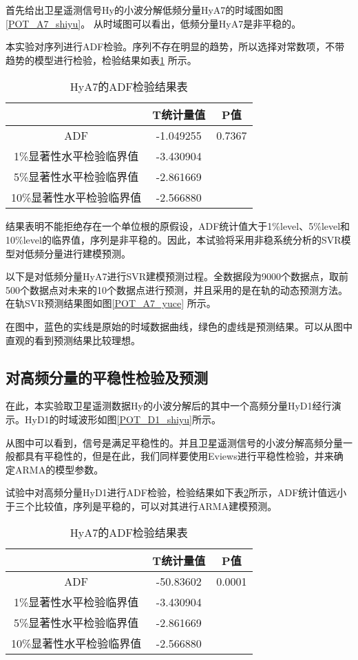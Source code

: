 首先给出卫星遥测信号Hy的小波分解低频分量HyA7的时域图如图\ref{POT_A7_shiyu}。
从时域图可以看出，低频分量HyA7是非平稳的。

本实验对序列进行ADF检验。序列不存在明显的趋势，所以选择对常数项，不带趋势的模型进行检验，检验结果如表\ref{tab:HyA7_ADF} 所示。
\begin{table}[htbp] 
	\centering
	\caption{\label{tab:HyA7_ADF}HyA7的ADF检验结果表} 
	\begin{tabular}{ccc} 
		\toprule 
		{} & T统计量值 & P值\\ 
		\midrule
		ADF & -1.049255 &  0.7367 \\
		1\%显著性水平检验临界值 & -3.430904 & {}\\ 
		5\%显著性水平检验临界值& -2.861669 & {}\\
		10\%显著性水平检验临界值& -2.566880 & {}\\
		\bottomrule 
	\end{tabular} 
\end{table}
结果表明不能拒绝存在一个单位根的原假设，ADF统计值大于1\%level、5\%level和10\%level的临界值，序列是非平稳的。因此，本试验将采用非稳系统分析的SVR模型对低频分量进行建模预测。

以下是对低频分量HyA7进行SVR建模预测过程。全数据段为9000个数据点，取前500个数据点对未来的10个数据点进行预测，并且采用的是在轨的动态预测方法。在轨SVR预测结果图如图\ref{POT_A7_yuce} 所示。

在图中，蓝色的实线是原始的时域数据曲线，绿色的虚线是预测结果。可以从图中直观的看到预测结果比较理想。

\subsection{对高频分量的平稳性检验及预测}
在此，本实验取卫星遥测数据Hy的小波分解后的其中一个高频分量HyD1经行演示。HyD1的时域波形如图\ref{POT_D1_shiyu}所示。

从图中可以看到，信号是满足平稳性的。并且卫星遥测信号的小波分解高频分量一般都具有平稳性的，但是在此，我们同样要使用Eviews进行平稳性检验，并来确定ARMA的模型参数。

试验中对高频分量HyD1进行ADF检验，检验结果如下表\ref{tab:HyD1_ADF}所示，ADF统计值远小于三个比较值，序列是平稳的，可以对其进行ARMA建模预测。
\begin{table}[htbp] 
	\centering
	\caption{\label{tab:HyD1_ADF}HyA7的ADF检验结果表} 
	\begin{tabular}{ccc} 
		\toprule 
		{} & T统计量值 & P值\\ 
		\midrule
		ADF & -50.83602 &  0.0001 \\
		1\%显著性水平检验临界值 & -3.430904 & {}\\ 
		5\%显著性水平检验临界值& -2.861669 & {}\\
		10\%显著性水平检验临界值& -2.566880 & {}\\
		\bottomrule 
	\end{tabular} 
\end{table}

